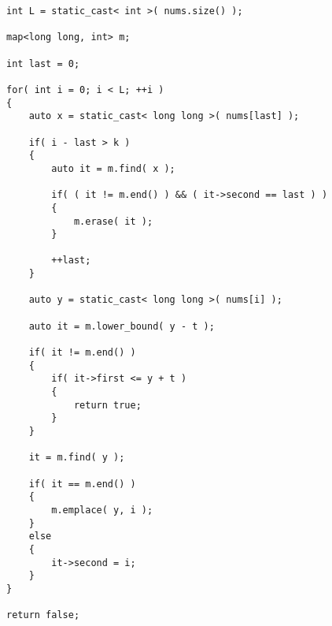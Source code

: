 \begin{lstlisting}[style=customc, caption={TreeMap}]
int L = static_cast< int >( nums.size() );

map<long long, int> m;

int last = 0;

for( int i = 0; i < L; ++i )
{
    auto x = static_cast< long long >( nums[last] );

    if( i - last > k )
    {
        auto it = m.find( x );

        if( ( it != m.end() ) && ( it->second == last ) )
        {
            m.erase( it );
        }

        ++last;
    }

    auto y = static_cast< long long >( nums[i] );

    auto it = m.lower_bound( y - t );

    if( it != m.end() )
    {
        if( it->first <= y + t )
        {
            return true;
        }
    }

    it = m.find( y );

    if( it == m.end() )
    {
        m.emplace( y, i );
    }
    else
    {
        it->second = i;
    }
}

return false;
\end{lstlisting}